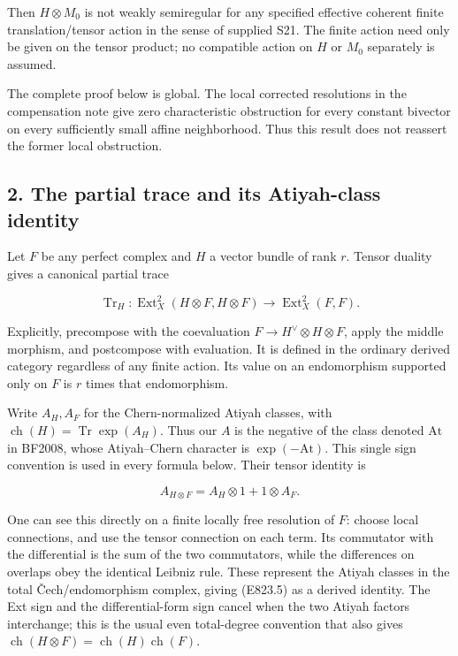 Then \(H\otimes M_0\) is not weakly semiregular for any specified
effective coherent finite translation/tensor action in the sense of
supplied S21. The finite action need only be given on the tensor
product; no compatible action on \(H\) or \(M_0\) separately is assumed.

The complete proof below is global. The local corrected resolutions in
the compensation note give zero characteristic obstruction for every
constant bivector on every sufficiently small affine neighborhood. Thus
this result does not reassert the former local obstruction.

\subsection{2. The partial trace and its Atiyah-class
identity}\label{SF-E823-the-partial-trace-and-its-atiyah-class-identity}

Let \(F\) be any perfect complex and \(H\) a vector bundle of rank
\(r\). Tensor duality gives a canonical partial trace

\[
 \operatorname{Tr}_H:
 \operatorname{Ext}^2_X(H\otimes F,H\otimes F)
       \longrightarrow\operatorname{Ext}^2_X(F,F).
 \tag{E823.4}
\]

Explicitly, precompose with the coevaluation
\(F\to H^\vee\otimes H\otimes F\), apply the middle morphism, and
postcompose with evaluation. It is defined in the ordinary derived
category regardless of any finite action. Its value on an endomorphism
supported only on \(F\) is \(r\) times that endomorphism.

Write \(A_H,A_F\) for the Chern-normalized Atiyah classes, with
\(\operatorname{ch}(H)=\operatorname{Tr}\exp(A_H)\). Thus our \(A\) is
the negative of the class denoted \(\mathrm{At}\) in BF2008, whose
Atiyah--Chern character is \(\exp(-\mathrm{At})\). This single sign
convention is used in every formula below. Their tensor identity is

\[
 A_{H\otimes F}=A_H\otimes1+1\otimes A_F.
 \tag{E823.5}
\]

One can see this directly on a finite locally free resolution of \(F\):
choose local connections, and use the tensor connection on each term.
Its commutator with the differential is the sum of the two commutators,
while the differences on overlaps obey the identical Leibniz rule. These
represent the Atiyah classes in the total Čech/endomorphism complex,
giving (E823.5) as a derived identity. The Ext sign and the
differential-form sign cancel when the two Atiyah factors interchange;
this is the usual even total-degree convention that also gives
\(\operatorname{ch}(H\otimes F)=
\operatorname{ch}(H)\operatorname{ch}(F)\).

